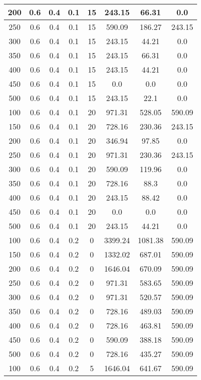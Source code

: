 \documentclass[a4paper, 12pt]{extreport}
\begin{document}
\begin{itemize}
\begin{longtable}{|c|c|c|c|c|c|c|c|}
			200 & 0.6 & 0.4 & 0.1 & 15 & 243.15 & 66.31 & 0.0 \\\hline
			250 & 0.6 & 0.4 & 0.1 & 15 & 590.09 & 186.27 & 243.15 \\\hline
			300 & 0.6 & 0.4 & 0.1 & 15 & 243.15 & 44.21 & 0.0 \\\hline
			350 & 0.6 & 0.4 & 0.1 & 15 & 243.15 & 66.31 & 0.0 \\\hline
			400 & 0.6 & 0.4 & 0.1 & 15 & 243.15 & 44.21 & 0.0 \\\hline
			450 & 0.6 & 0.4 & 0.1 & 15 & 0.0 & 0.0 & 0.0 \\\hline
			500 & 0.6 & 0.4 & 0.1 & 15 & 243.15 & 22.1 & 0.0 \\\hline
			100 & 0.6 & 0.4 & 0.1 & 20 & 971.31 & 528.05 & 590.09 \\\hline
			150 & 0.6 & 0.4 & 0.1 & 20 & 728.16 & 230.36 & 243.15 \\\hline
			200 & 0.6 & 0.4 & 0.1 & 20 & 346.94 & 97.85 & 0.0 \\\hline
			250 & 0.6 & 0.4 & 0.1 & 20 & 971.31 & 230.36 & 243.15 \\\hline
			300 & 0.6 & 0.4 & 0.1 & 20 & 590.09 & 119.96 & 0.0 \\\hline
			350 & 0.6 & 0.4 & 0.1 & 20 & 728.16 & 88.3 & 0.0 \\\hline
			400 & 0.6 & 0.4 & 0.1 & 20 & 243.15 & 88.42 & 0.0 \\\hline
			450 & 0.6 & 0.4 & 0.1 & 20 & 0.0 & 0.0 & 0.0 \\\hline
			500 & 0.6 & 0.4 & 0.1 & 20 & 243.15 & 44.21 & 0.0 \\\hline
			100 & 0.6 & 0.4 & 0.2 & 0 & 3399.24 & 1081.38 & 590.09 \\\hline
			150 & 0.6 & 0.4 & 0.2 & 0 & 1332.02 & 687.01 & 590.09 \\\hline
			200 & 0.6 & 0.4 & 0.2 & 0 & 1646.04 & 670.09 & 590.09 \\\hline
			250 & 0.6 & 0.4 & 0.2 & 0 & 971.31 & 583.65 & 590.09 \\\hline
			300 & 0.6 & 0.4 & 0.2 & 0 & 971.31 & 520.57 & 590.09 \\\hline
			350 & 0.6 & 0.4 & 0.2 & 0 & 728.16 & 489.03 & 590.09 \\\hline
			400 & 0.6 & 0.4 & 0.2 & 0 & 728.16 & 463.81 & 590.09 \\\hline
			450 & 0.6 & 0.4 & 0.2 & 0 & 590.09 & 388.18 & 590.09 \\\hline
			500 & 0.6 & 0.4 & 0.2 & 0 & 728.16 & 435.27 & 590.09 \\\hline
			100 & 0.6 & 0.4 & 0.2 & 5 & 1646.04 & 641.67 & 590.09 \\\hline

\end{longtable}
\end{itemize}
\end{document}
